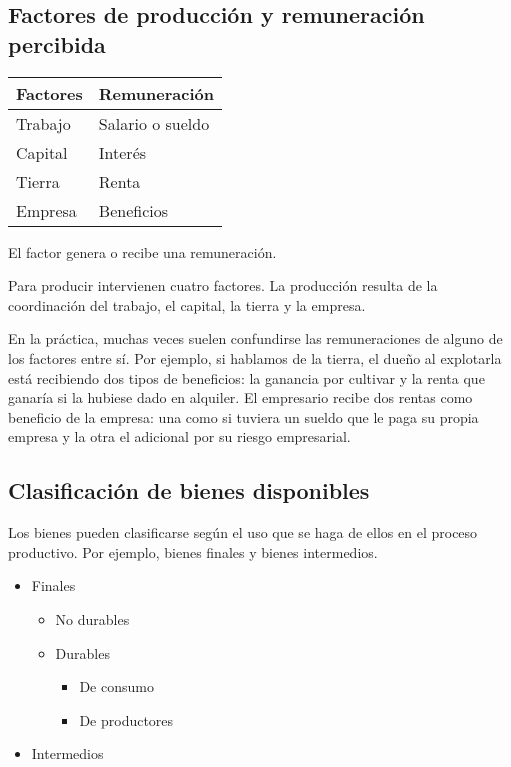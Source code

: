 \subsection{Factores de producción y remuneración percibida}

\vspace{.5cm}
\begin{table}[H]
    \centering
    \begin{tabular}{ll}
        Factores & Remuneración     \\
        \hline
        Trabajo  & Salario o sueldo \\
        Capital  & Interés          \\
        Tierra   & Renta            \\
        Empresa  & Beneficios       \\
        \hline
    \end{tabular}
\end{table}
\vspace{.5cm}

El factor genera o recibe una remuneración.

Para producir intervienen cuatro factores.
La producción resulta de la coordinación del trabajo, 
el capital, la tierra y la empresa.

En la práctica,
muchas veces suelen confundirse las remuneraciones de alguno 
de los factores entre sí.
Por ejemplo,
si hablamos de la tierra,
el dueño al explotarla está recibiendo dos tipos de beneficios:
la ganancia por cultivar 
y la renta que ganaría si la hubiese dado en alquiler.
El empresario recibe dos rentas como beneficio de la empresa:
una como si tuviera un sueldo que le paga su propia empresa
y la otra el adicional por su riesgo empresarial.

\subsection{Clasificación de bienes disponibles}

Los bienes pueden clasificarse según el uso que se haga de ellos 
en el proceso productivo.
Por ejemplo,
bienes finales y bienes intermedios.

\begin{itemize}
    \item Finales
          \begin{itemize}
              \item No durables
              \item Durables
                    \begin{itemize}
                        \item De consumo
                        \item De productores
                    \end{itemize}
          \end{itemize}
    \item Intermedios
\end{itemize}

